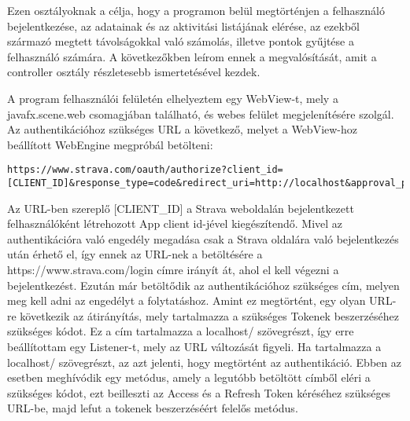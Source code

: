 Ezen osztályoknak a célja, hogy a programon belül megtörténjen a felhasználó bejelentkezése, az adatainak és az aktivitási listájának elérése, az ezekből származó megtett távolságokkal való számolás, illetve pontok gyűjtése a felhasználó számára. A következőkben leírom ennek a megvalósítását, amit a controller osztály részletesebb ismertetésével kezdek. 

A program felhasználói felületén elhelyeztem egy WebView-t, mely a javafx.scene.web csomagjában található, és webes felület megjelenítésére szolgál. Az authentikációhoz szükséges URL a következő, melyet a WebView-hoz beállított WebEngine megpróbál betölteni: 

\begin{verbatim}
https://www.strava.com/oauth/authorize?client_id=[CLIENT_ID]&response_type=code&redirect_uri=http://localhost&approval_prompt=force&scope=activity:read_all 
\end{verbatim}





Az URL-ben szereplő [CLIENT\_ID] a Strava weboldalán bejelentkezett felhasználóként létrehozott App client id-jével kiegészítendő. Mivel az authentikációra való engedély megadása csak a Strava oldalára való bejelentkezés után érhető el, így ennek az URL-nek a betöltésére a https://www.strava.com/login címre irányít át, ahol el kell végezni a bejelentkezést. Ezután már betöltődik az authentikációhoz szükséges cím, melyen meg kell adni az engedélyt a folytatáshoz. Amint ez megtörtént, egy olyan URL-re következik az átirányítás, mely tartalmazza a szükséges Tokenek beszerzéséhez szükséges kódot. Ez a cím tartalmazza a localhost/ szövegrészt, így erre beállítottam egy Listener-t, mely az URL változását figyeli. Ha tartalmazza a localhost/ szövegrészt, az azt jelenti, hogy megtörtént az authentikáció. Ebben az esetben meghívódik egy metódus, amely a legutóbb betöltött címből eléri a szükséges kódot, ezt beilleszti az Access és a Refresh Token kéréséhez szükséges URL-be, majd lefut a tokenek beszerzéséért felelős metódus. 

